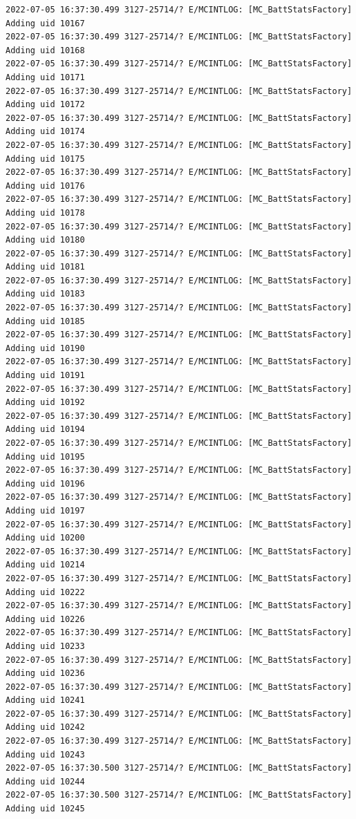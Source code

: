 \documentclass[a4paper,12pt]{book}
\begin{document}
\begin{lstlisting}
2022-07-05 16:37:30.499 3127-25714/? E/MCINTLOG: [MC_BattStatsFactory] Adding uid 10167
2022-07-05 16:37:30.499 3127-25714/? E/MCINTLOG: [MC_BattStatsFactory] Adding uid 10168
2022-07-05 16:37:30.499 3127-25714/? E/MCINTLOG: [MC_BattStatsFactory] Adding uid 10171
2022-07-05 16:37:30.499 3127-25714/? E/MCINTLOG: [MC_BattStatsFactory] Adding uid 10172
2022-07-05 16:37:30.499 3127-25714/? E/MCINTLOG: [MC_BattStatsFactory] Adding uid 10174
2022-07-05 16:37:30.499 3127-25714/? E/MCINTLOG: [MC_BattStatsFactory] Adding uid 10175
2022-07-05 16:37:30.499 3127-25714/? E/MCINTLOG: [MC_BattStatsFactory] Adding uid 10176
2022-07-05 16:37:30.499 3127-25714/? E/MCINTLOG: [MC_BattStatsFactory] Adding uid 10178
2022-07-05 16:37:30.499 3127-25714/? E/MCINTLOG: [MC_BattStatsFactory] Adding uid 10180
2022-07-05 16:37:30.499 3127-25714/? E/MCINTLOG: [MC_BattStatsFactory] Adding uid 10181
2022-07-05 16:37:30.499 3127-25714/? E/MCINTLOG: [MC_BattStatsFactory] Adding uid 10183
2022-07-05 16:37:30.499 3127-25714/? E/MCINTLOG: [MC_BattStatsFactory] Adding uid 10185
2022-07-05 16:37:30.499 3127-25714/? E/MCINTLOG: [MC_BattStatsFactory] Adding uid 10190
2022-07-05 16:37:30.499 3127-25714/? E/MCINTLOG: [MC_BattStatsFactory] Adding uid 10191
2022-07-05 16:37:30.499 3127-25714/? E/MCINTLOG: [MC_BattStatsFactory] Adding uid 10192
2022-07-05 16:37:30.499 3127-25714/? E/MCINTLOG: [MC_BattStatsFactory] Adding uid 10194
2022-07-05 16:37:30.499 3127-25714/? E/MCINTLOG: [MC_BattStatsFactory] Adding uid 10195
2022-07-05 16:37:30.499 3127-25714/? E/MCINTLOG: [MC_BattStatsFactory] Adding uid 10196
2022-07-05 16:37:30.499 3127-25714/? E/MCINTLOG: [MC_BattStatsFactory] Adding uid 10197
2022-07-05 16:37:30.499 3127-25714/? E/MCINTLOG: [MC_BattStatsFactory] Adding uid 10200
2022-07-05 16:37:30.499 3127-25714/? E/MCINTLOG: [MC_BattStatsFactory] Adding uid 10214
2022-07-05 16:37:30.499 3127-25714/? E/MCINTLOG: [MC_BattStatsFactory] Adding uid 10222
2022-07-05 16:37:30.499 3127-25714/? E/MCINTLOG: [MC_BattStatsFactory] Adding uid 10226
2022-07-05 16:37:30.499 3127-25714/? E/MCINTLOG: [MC_BattStatsFactory] Adding uid 10233
2022-07-05 16:37:30.499 3127-25714/? E/MCINTLOG: [MC_BattStatsFactory] Adding uid 10236
2022-07-05 16:37:30.499 3127-25714/? E/MCINTLOG: [MC_BattStatsFactory] Adding uid 10241
2022-07-05 16:37:30.499 3127-25714/? E/MCINTLOG: [MC_BattStatsFactory] Adding uid 10242
2022-07-05 16:37:30.499 3127-25714/? E/MCINTLOG: [MC_BattStatsFactory] Adding uid 10243
2022-07-05 16:37:30.500 3127-25714/? E/MCINTLOG: [MC_BattStatsFactory] Adding uid 10244
2022-07-05 16:37:30.500 3127-25714/? E/MCINTLOG: [MC_BattStatsFactory] Adding uid 10245

\end{lstlisting}
\end{document}
